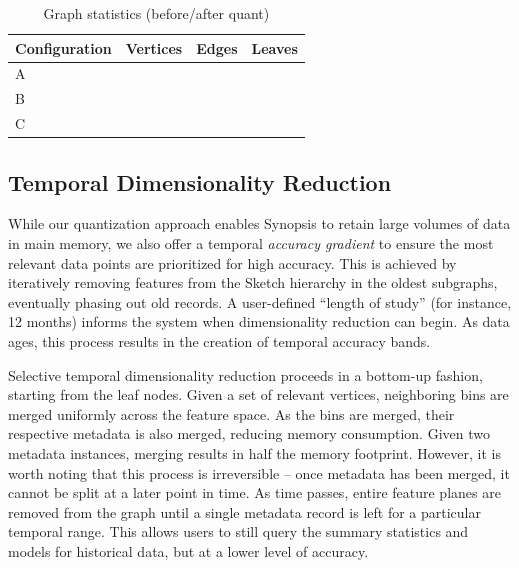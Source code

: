 \begin{table}[h!]
    \renewcommand{\arraystretch}{1.3}
    \caption{Graph statistics (before/after quant)}
    \label{tbl:graph-stats}
    \begin{center}
        \begin{tabular}{|l|c|c|c|}
            \hline
            Configuration & Vertices & Edges & Leaves \\
            \hline
            A & & & \\
            \hline
            B & & & \\
            \hline
            C & & & \\
            \hline
        \end{tabular}
    \end{center}
\end{table}

\subsection{Temporal Dimensionality Reduction}
While our quantization approach enables Synopsis to retain large volumes of data in main memory, we also offer a temporal \emph{accuracy gradient} to ensure the most relevant data points are prioritized for high accuracy. This is achieved by iteratively removing features from the Sketch hierarchy in the oldest subgraphs, eventually phasing out old records. A user-defined ``length of study'' (for instance, 12 months) informs the system when dimensionality reduction can begin. As data ages, this process results in the creation of temporal accuracy bands.

Selective temporal dimensionality reduction proceeds in a bottom-up fashion, starting from the leaf nodes. Given a set of relevant vertices, neighboring bins are merged uniformly across the feature space. As the bins are merged, their respective metadata is also merged, reducing memory consumption. Given two metadata instances, merging results in half the memory footprint. However, it is worth noting that this process is irreversible -- once metadata has been merged, it cannot be split at a later point in time. As time passes, entire feature planes are removed from the graph until a single metadata record is left for a particular temporal range. This allows users to still query the summary statistics and models for historical data, but at a lower level of accuracy.

